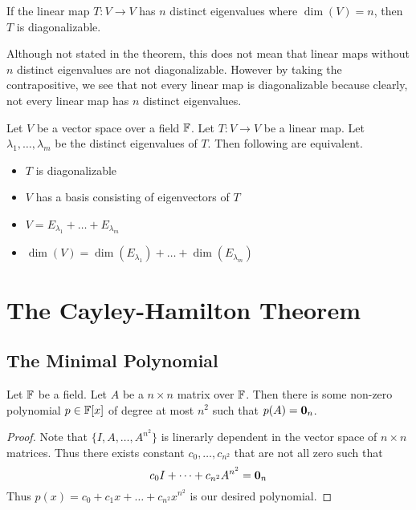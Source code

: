 \documentclass[a4paper]{article}
\begin{document}
\begin{thm}{}{} If the linear map $T:V\to V$ has $n$ distinct eigenvalues where $\dim(V)=n$, then $T$ is diagonalizable. 
\end{thm}

Although not stated in the theorem, this does not mean that linear maps without $n$ distinct eigenvalues are not diagonalizable. However by taking the contrapositive, we see that not every linear map is diagonalizable because clearly, not every linear map has $n$ distinct eigenvalues. 

\begin{thm}{}{} Let $V$ be a vector space over a field $\mathbb{F}$. Let $T:V\to V$ be a linear map. Let $\lambda_1,\dots,\lambda_m$ be the distinct eigenvalues of $T$. Then following are equivalent. 
\begin{itemize}
\item $T$ is diagonalizable
\item $V$ has a basis consisting of eigenvectors of $T$
\item $V=E_{\lambda_1}+\dots+E_{\lambda_m}$
\item $\dim(V)=\dim(E_{\lambda_1})+\dots+\dim(E_{\lambda_m})$
\end{itemize}
\end{thm}

\pagebreak
\section{The Cayley-Hamilton Theorem}
\subsection{The Minimal Polynomial}
\begin{thm}{}{} Let $\mathbb{F}$ be a field. Let $A$ be a $n\times n$ matrix over $\mathbb{F}$. Then there is some non-zero polynomial $p\in\mathbb{F}[x]$ of degree at most $n^2$ such that $p(A)=\vb{0}_n$. \tcbline\begin{proof} Note that $\{I,A,\dots,A^{n^2}\}$ is linerarly dependent in the vector space of $n\times n$ matrices. Thus there exists constant $c_0,\dots,c_{n^2}$ that are not all zero such that $$c_0I+\dots+c_{n^2}A^{n^2}=\vb{0}_n$$ Thus $p(x)=c_0+c_1x+\dots+c_{n^2}x^{n^2}$ is our desired polynomial. 
\end{proof}
\end{thm}
\end{document}

